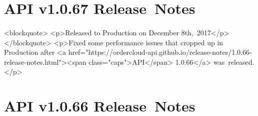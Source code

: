 \documentclass{memoir}%
\begin{document}
%
\section*{API v1.0.67 Release~Notes}%
\paragraph*{}%

%
\paragraph*{}%
<blockquote>\newline%
<p>Released to Production on December 8th,~2017</p>\newline%
</blockquote>\newline%
<p>Fixed some performance issues that cropped up in Production after <a href="https://ordercloud{-}api.github.io/release{-}notes/1.0.66{-}release{-}notes.html"><span class="caps">API</span> 1.0.66</a> was~released.</p>

%
\section*{API v1.0.66 Release~Notes}%
\paragraph*{}%

%
\end{document}
